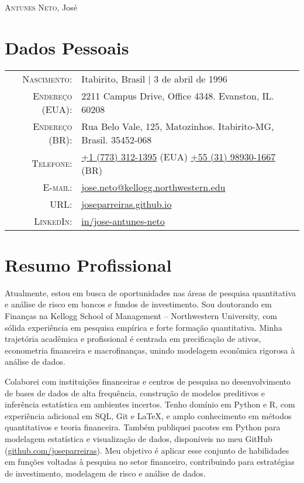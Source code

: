 \documentclass[a4paper,10pt]{article}
\begin{document}
\par{
    \centering
    {\Huge \textsc{Antunes Neto}, José
    }\bigskip\par
}

\section{Dados Pessoais}

\begin{tabular}{rp{10.75cm}}
    \textsc{Nascimento:} & Itabirito, Brasil | 3 de abril de 1996 \\
    \textsc{Endereço (EUA):}   & 2211 Campus Drive, Office 4348. Evanston, IL. 60208 \\
    \textsc{Endereço (BR):}& Rua Belo Vale, 125, Matozinhos. Itabirito-MG, Brasil. 35452-068 \\
    \textsc{Telefone:}     & \href{tel:+17733121395}{+1 (773) 312-1395} (EUA) \quad \href{tel:+5531989301667}{+55 (31) 98930-1667} (BR) \\
    \textsc{E-mail:}     & \href{mailto:jose.neto@kellogg.northwestern.edu}{jose.neto@kellogg.northwestern.edu} \\
    \textsc{URL:}   & \href{http://joseparreiras.github.io}{joseparreiras.github.io} \\
    \textsc{LinkedIn:}  & \href{https://www.linkedin.com/in/jose-antunes-neto/}{in/jose-antunes-neto}
\end{tabular}

\section{Resumo Profissional}

\noindent
Atualmente, estou em busca de oportunidades nas áreas de pesquisa quantitativa e análise de risco em bancos e fundos de investimento. Sou doutorando em Finanças na Kellogg School of Management – Northwestern University, com sólida experiência em pesquisa empírica e forte formação quantitativa. Minha trajetória acadêmica e profissional é centrada em precificação de ativos, econometria financeira e macrofinanças, unindo modelagem econômica rigorosa à análise de dados.

Colaborei com instituições financeiras e centros de pesquisa no desenvolvimento de bases de dados de alta frequência, construção de modelos preditivos e inferência estatística em ambientes incertos. Tenho domínio em Python e R, com experiência adicional em SQL, Git e \LaTeX{}, e amplo conhecimento em métodos quantitativos e teoria financeira. Também publiquei pacotes em Python para modelagem estatística e visualização de dados, disponíveis no meu GitHub (\href{https://github.com/joseparreiras}{github.com/joseparreiras}). Meu objetivo é aplicar esse conjunto de habilidades em funções voltadas à pesquisa no setor financeiro, contribuindo para estratégias de investimento, modelagem de risco e análise de dados.
\end{document}
